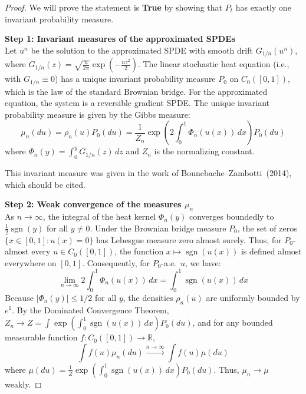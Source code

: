 \documentclass[12pt]{article}
\newcommand{\review}[1]{\begin{reviewbox}#1\end{reviewbox}}
\begin{document}
\begin{proof}
We will prove the statement is \textbf{True} by showing that $P_t$ has exactly one invariant probability measure.

\medskip\noindent
\textbf{Step 1: Invariant measures of the approximated SPDEs}\\
Let $u^n$ be the solution to the approximated SPDE with smooth drift $G_{1/n}(u^n)$, where $G_{1/n}(z) = \sqrt{\frac{n}{2\pi}} \exp\left(-\frac{n z^2}{2}\right)$. 
The linear stochastic heat equation (i.e., with $G_{1/n} \equiv 0$) has a unique invariant probability measure $P_0$ on $C_0([0,1])$, which is the law of the standard Brownian bridge. 
For the approximated equation, the system is a reversible gradient SPDE. The unique invariant probability measure is given by the Gibbs measure:
\[ \mu_n(du) = \rho_n(u) P_0(du) = \frac{1}{Z_n} \exp\left(2 \int_0^1 \Phi_n(u(x)) \, dx\right) P_0(du) \]
where $\Phi_n(y) = \int_0^y G_{1/n}(z) \, dz$ and $Z_n$ is the normalizing constant. \review{This invariant measure was given in the work of Bounebache--Zambotti~(2014), which should be cited.}

\medskip\noindent
\textbf{Step 2: Weak convergence of the measures $\mu_n$}\\
As $n \to \infty$, the integral of the heat kernel $\Phi_n(y)$ converges boundedly to $\frac{1}{2}\operatorname{sgn}(y)$ for all $y \neq 0$. 
Under the Brownian bridge measure $P_0$, the set of zeros $\{x \in [0,1] : u(x) = 0\}$ has Lebesgue measure zero almost surely. Thus, for $P_0$-almost every $u \in C_0([0,1])$, the function $x \mapsto \operatorname{sgn}(u(x))$ is defined almost everywhere on $[0,1]$.
Consequently, for $P_0$-a.e.\ $u$, we have:
\[ \lim_{n\to\infty} 2\int_0^1 \Phi_n(u(x)) \, dx = \int_0^1 \operatorname{sgn}(u(x)) \, dx \]
Because $|\Phi_n(y)| \le 1/2$ for all $y$, the densities $\rho_n(u)$ are uniformly bounded by $e^1$. By the Dominated Convergence Theorem, $Z_n \to Z = \int \exp\left(\int_0^1 \operatorname{sgn}(u(x)) \, dx\right) P_0(du)$, and for any bounded measurable function $f\colon C_0([0,1]) \to \mathbb{R}$,
\[ \int f(u) \mu_n(du) \xrightarrow{n \to \infty} \int f(u) \mu(du) \]
where $\mu(du) = \frac{1}{Z} \exp\left( \int_0^1 \operatorname{sgn}(u(x)) \, dx \right) P_0(du)$. Thus, $\mu_n \to \mu$ weakly.


\end{proof}
\end{document}
